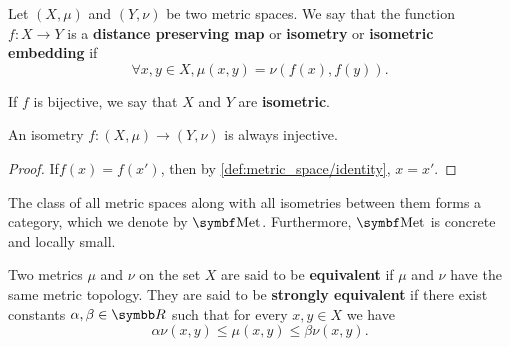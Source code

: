 \begin{definition}\label{def:isometry}\cite[253]{Engelking1989}
  Let \( (X, \mu) \) and \( (Y, \nu) \) be two metric spaces. We say that the function \( f: X \to Y \) is a \textbf{distance preserving map} or \textbf{isometry} or \textbf{isometric embedding} if
  \begin{equation*}
    \forall x, y \in X, \mu(x, y) = \nu(f(x), f(y)).
  \end{equation*}

  If \( f \) is bijective, we say that \( X \) and \( Y \) are \textbf{isometric}.
\end{definition}

\begin{proposition}\label{def:isometry_is_injective}
  An isometry \( f: (X, \mu) \to (Y, \nu) \) is always injective.
\end{proposition}
\begin{proof}
  If\LEM \( f(x) = f(x') \), then by \ref{def:metric_space/identity}, \( x = x' \).
\end{proof}

\begin{definition}\label{def:category_of_metric_spaces}
  The class of all metric spaces along with all isometries between them forms a category, which we denote by \( \Bold{Met} \). Furthermore, \( \Bold{Met} \) is concrete and locally small.
\end{definition}

\begin{definition}\label{def:equivalent_metrics}
  Two metrics \( \mu \) and \( \nu \) on the set \( X \) are said to be \textbf{equivalent} if \( \mu \) and \( \nu \) have the same metric topology. They are said to be \textbf{strongly equivalent} if there exist constants \( \alpha, \beta \in \R \) such that for every \( x, y \in X \) we have
  \begin{equation*}
    \alpha \nu(x, y) \leq \mu(x, y) \leq \beta \nu(x, y).
  \end{equation*}
\end{definition}

